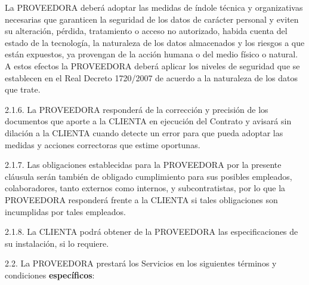 \documentclass[11pt,spanish,a4paper,]{article}
\begin{document}
La PROVEEDORA deberá adoptar las medidas de índole técnica y
organizativas necesarias que garanticen la seguridad de los datos de
carácter personal y eviten su alteración, pérdida, tratamiento o acceso
no autorizado, habida cuenta del estado de la tecnología, la naturaleza
de los datos almacenados y los riesgos a que están expuestos, ya
provengan de la acción humana o del medio físico o natural. A estos
efectos la PROVEEDORA deberá aplicar los niveles de seguridad que se
establecen en el Real Decreto 1720/2007 de acuerdo a la naturaleza de
los datos que trate.

2.1.6. La PROVEEDORA responderá de la corrección y precisión de los
documentos que aporte a la CLIENTA en ejecución del Contrato y avisará
sin dilación a la CLIENTA cuando detecte un error para que pueda adoptar
las medidas y acciones correctoras que estime oportunas.

2.1.7. Las obligaciones establecidas para la PROVEEDORA por la presente
cláusula serán también de obligado cumplimiento para sus posibles
empleados, colaboradores, tanto externos como internos, y
subcontratistas, por lo que la PROVEEDORA responderá frente a la CLIENTA
si tales obligaciones son incumplidas por tales empleados.

2.1.8. La CLIENTA podrá obtener de la PROVEEDORA las especificaciones de
su instalación, si lo requiere.

2.2. La PROVEEDORA prestará los Servicios en los siguientes términos y
condiciones \textbf{específicos}:
\end{document}
